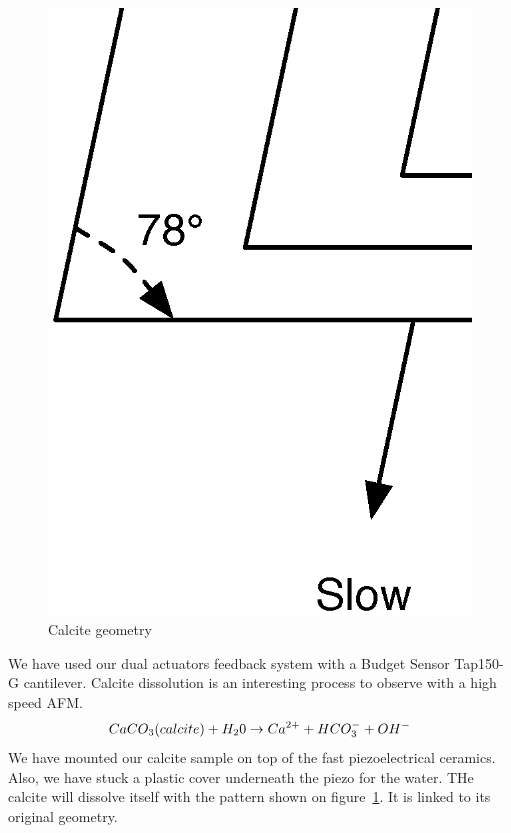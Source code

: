 \begin{figure}[H]
  \centering
  \includegraphics[scale=0.3]{images/calcitegeometry.eps}
    \caption{Calcite geometry}
  \label{fig:calcitegeometry}
\end{figure}
We have used our dual actuators feedback system with a Budget Sensor Tap150-G cantilever. Calcite dissolution is an interesting process to observe with a high speed AFM.
\begin{equation}\label{calcite}
\centering
	CaCO_3(calcite) + H_20 \rightarrow Ca^{2+} + HCO_3^- + OH^- 
\end{equation}
We have mounted our calcite sample on top of the fast piezoelectrical ceramics. Also, we have stuck a plastic cover underneath the piezo for the water. THe calcite will dissolve itself with the pattern shown on figure~\ref{fig:calcitegeometry}. It is linked to its original geometry.
